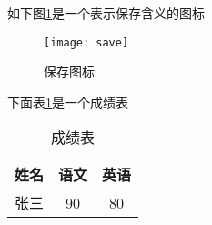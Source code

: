 \documentclass{ctexart}
\begin{document}
	
	如下图\ref{save}是一个表示保存含义的图标 \\
	\begin{figure}[h] %
		
		\centering %
		
		\texttt{[image: save]} %
		
		\caption{保存图标} %
		
		\label{save} %
		
	\end{figure}

下面表\ref{table1}是一个成绩表

	\begin{table}[h]
		
		\centering
		
		\caption{成绩表}
		
		\label{table1}
		
		\begin{tabular}{|c| c| c|}
			
			\hline			
			姓名 & 语文 & 英语 \\			
			\hline			
			张三 & 90	 &  80 \\			
			\hline
			
		\end{tabular}
		
	\end{table}
	
\end{document}
